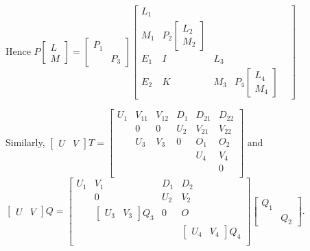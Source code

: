 \documentclass{article}
\begin{document}
Hence
$  P
  \begin{bmatrix}
    L\\M
  \end{bmatrix}
=
\begin{bmatrix}
    P_1\\&P_3
  \end{bmatrix}
\left[
  \begin{array}{cccccc}
  L_1  \\
  M_1 & P_2
  \begin{bmatrix}
    L_2\\M_2
  \end{bmatrix}\\
  \hline
  E_1   &  I  &L_3\\
  E_{2} &K & M_{3}  & P_4
  \begin{bmatrix}
    L_4\\M_4
  \end{bmatrix}&
  \end{array}
\right]
\label{eq:PL}
$


Similarly,
$
  \begin{bmatrix}
    U&V
  \end{bmatrix}
T =
\left[
  \begin{array}{ccc|ccc}
    U_1 & V_{11} & V_{12}& D_1 & D_{21}& D_{22}\\
        &0      &0     & U_2 & V_{21}& V_{22}\\
        &U_3    & V_3  &  0   & O_1   & O_2\\
        &       &      &    & U_4   & V_4\\
        &       &      &    &       &0\\
  \end{array}
\right]
$
and 
$
  \begin{bmatrix}
    U&V
  \end{bmatrix}
  Q =
\left[
\begin{array}{cc|cccc}
  U_1 & V_1 &D_1 & D_2\\
      & 0   & U_2& V_2 \\
      &\begin{bmatrix}U_3&V_3\end{bmatrix} Q_3 &0 & O\\
      &                 &    &\begin{bmatrix}U_4&V_4\end{bmatrix} Q_4\\
\end{array}
\right]
  \begin{bmatrix}
    Q_1\\&Q_2
  \end{bmatrix}.
$
\end{document}
